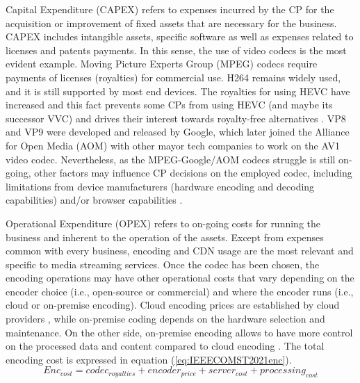 Capital Expenditure (CAPEX) refers to expenses incurred by the CP for the acquisition or improvement of fixed assets that are necessary for the business. CAPEX includes intangible assets, specific software as well as expenses related to licenses and patents payments. In this sense, the use of video codecs is the most evident example. Moving Picture Experts Group (MPEG) codecs require payments of licenses (royalties) for commercial use. H264 remains widely used, and it is still supported by most end devices. The royalties for using HEVC have increased \cite{OzerLicense} and this fact prevents some CPs from using HEVC (and maybe its successor VVC) and drives their interest towards royalty-free alternatives \cite{OzerLicense-2}. VP8 and VP9 were developed and released by Google, which later joined the Alliance for Open Media (AOM) with other mayor tech companies to work on the AV1 video codec. Nevertheless, as the MPEG-Google/AOM codecs struggle is still on-going, other factors may influence CP decisions on the employed codec, including limitations from device manufacturers (hardware encoding and decoding capabilities) and/or browser capabilities \cite{MozillaCodecs}.

Operational Expenditure (OPEX) refers to on-going costs for running the business and inherent to the operation of the assets. Except from expenses common with every business, encoding and CDN usage are the most relevant and specific to media streaming services. Once the codec has been chosen, the encoding operations may have other operational costs that vary depending on the encoder choice (i.e., open-source or commercial) and where the encoder runs (i.e., cloud or on-premise encoding). Cloud encoding prices are established by cloud providers \cite{OzerCloud}, while on-premise coding depends on the hardware selection and maintenance. On the other side, on-premise encoding allows to have more control on the processed data and content compared to cloud encoding \cite{BasuEncoding, PellenEncoding}. The total encoding cost is expressed in equation (\ref{eq:IEEECOMST2021enc}).
\begin{equation}
	\label{eq:IEEECOMST2021enc}
	Enc_{cost} = codec_{royalties} + encoder_{price} + server_{cost} + processing_{cost}
\end{equation}

